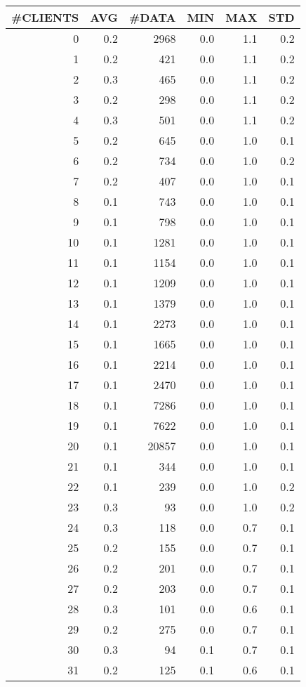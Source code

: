 \begin{tabular}{|r|r|r|r|r|r|}
\hline
 \#CLIENTS & AVG & \#DATA & MIN & MAX & STD\\
\hline
0 &  0.2 & 2968 & 0.0 & 1.1 & 0.2\\
1 &  0.2 & 421 & 0.0 & 1.1 & 0.2\\
2 &  0.3 & 465 & 0.0 & 1.1 & 0.2\\
3 &  0.2 & 298 & 0.0 & 1.1 & 0.2\\
4 &  0.3 & 501 & 0.0 & 1.1 & 0.2\\
5 &  0.2 & 645 & 0.0 & 1.0 & 0.1\\
6 &  0.2 & 734 & 0.0 & 1.0 & 0.2\\
7 &  0.2 & 407 & 0.0 & 1.0 & 0.1\\
8 &  0.1 & 743 & 0.0 & 1.0 & 0.1\\
9 &  0.1 & 798 & 0.0 & 1.0 & 0.1\\
10 &  0.1 & 1281 & 0.0 & 1.0 & 0.1\\
11 &  0.1 & 1154 & 0.0 & 1.0 & 0.1\\
12 &  0.1 & 1209 & 0.0 & 1.0 & 0.1\\
13 &  0.1 & 1379 & 0.0 & 1.0 & 0.1\\
14 &  0.1 & 2273 & 0.0 & 1.0 & 0.1\\
15 &  0.1 & 1665 & 0.0 & 1.0 & 0.1\\
16 &  0.1 & 2214 & 0.0 & 1.0 & 0.1\\
17 &  0.1 & 2470 & 0.0 & 1.0 & 0.1\\
18 &  0.1 & 7286 & 0.0 & 1.0 & 0.1\\
19 &  0.1 & 7622 & 0.0 & 1.0 & 0.1\\
20 &  0.1 & 20857 & 0.0 & 1.0 & 0.1\\
21 &  0.1 & 344 & 0.0 & 1.0 & 0.1\\
22 &  0.1 & 239 & 0.0 & 1.0 & 0.2\\
23 &  0.3 & 93 & 0.0 & 1.0 & 0.2\\
24 &  0.3 & 118 & 0.0 & 0.7 & 0.1\\
25 &  0.2 & 155 & 0.0 & 0.7 & 0.1\\
26 &  0.2 & 201 & 0.0 & 0.7 & 0.1\\
27 &  0.2 & 203 & 0.0 & 0.7 & 0.1\\
28 &  0.3 & 101 & 0.0 & 0.6 & 0.1\\
29 &  0.2 & 275 & 0.0 & 0.7 & 0.1\\
30 &  0.3 & 94 & 0.1 & 0.7 & 0.1\\
31 &  0.2 & 125 & 0.1 & 0.6 & 0.1\\

\end{tabular}
